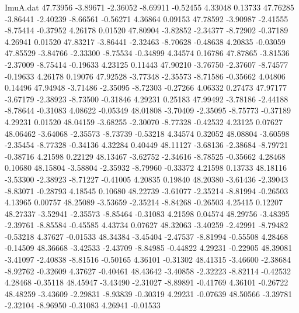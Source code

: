 \begin{filecontents}{ImuA.dat}
  47.73956   -3.89671   -2.36052   -8.69911   -0.52455    4.33048    0.13733
  47.76285   -3.86441   -2.40239   -8.66561   -0.56271    4.36864    0.09153
  47.78592   -3.90987   -2.41555   -8.75414   -0.37952    4.26178    0.01520
  47.80904   -3.82852   -2.34377   -8.72902   -0.37189    4.26941    0.01520
  47.83217   -3.86441   -2.32463   -8.70628   -0.48638    4.20835   -0.03059
  47.85529   -3.84766   -2.33300   -8.75534   -0.34899    4.34574    0.16786
  47.87865   -3.81536   -2.37009   -8.75414   -0.19633    4.23125    0.11443
  47.90210   -3.76750   -2.37607   -8.74577   -0.19633    4.26178    0.19076
  47.92528   -3.77348   -2.35573   -8.71586   -0.35662    4.04806    0.14496
  47.94948   -3.71486   -2.35095   -8.72303   -0.27266    4.06332    0.27473
  47.97177   -3.67179   -2.38923   -8.73500   -0.31846    4.29231    0.25183
  47.99492   -3.78186   -2.44188   -8.78644   -0.31083    4.08622   -0.05349
  48.01808   -3.70409   -2.35095   -8.75773   -0.37189    4.29231    0.01520
  48.04159   -3.68255   -2.30070   -8.77328   -0.42532    4.23125    0.07627
  48.06462   -3.64068   -2.35573   -8.73739   -0.53218    4.34574    0.32052
  48.08804   -3.60598   -2.35454   -8.77328   -0.34136    4.32284    0.40449
  48.11127   -3.68136   -2.38684   -8.79721   -0.38716    4.21598    0.22129
  48.13467   -3.62752   -2.34616   -8.78525   -0.35662    4.28468    0.10680
  48.15804   -3.58804   -2.35932   -8.79960   -0.33372    4.21598    0.13733
  48.18116   -3.53300   -2.38923   -8.71227   -0.41005    4.20835    0.19840
  48.20380   -3.61436   -2.39043   -8.83071   -0.28793    4.18545    0.10680
  48.22739   -3.61077   -2.35214   -8.81994   -0.26503    4.13965    0.00757
  48.25089   -3.53659   -2.35214   -8.84268   -0.26503    4.25415    0.12207
  48.27337   -3.52941   -2.35573   -8.85464   -0.31083    4.21598    0.04574
  48.29756   -3.48395   -2.39761   -8.85584   -0.45585    4.43734    0.07627
  48.32063   -3.40259   -2.42991   -8.79482   -0.53218    4.37627   -0.01533
  48.34384   -3.45404   -2.47537   -8.81994   -0.55508    4.28468   -0.14509
  48.36668   -3.42533   -2.43709   -8.84985   -0.44822    4.29231   -0.22905
  48.39081   -3.41097   -2.40838   -8.81516   -0.50165    4.36101   -0.31302
  48.41315   -3.46600   -2.38684   -8.92762   -0.32609    4.37627   -0.40461
  48.43642   -3.40858   -2.32223   -8.82114   -0.42532    4.28468   -0.35118
  48.45947   -3.43490   -2.31027   -8.89891   -0.41769    4.36101   -0.26722
  48.48259   -3.43609   -2.29831   -8.93839   -0.30319    4.29231   -0.07639
  48.50566   -3.39781   -2.32104   -8.96950   -0.31083    4.26941   -0.01533

\end{filecontents}
